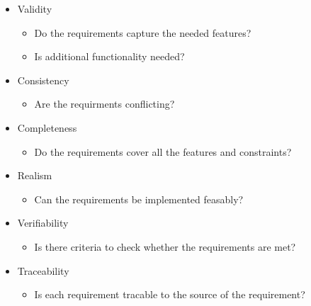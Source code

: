 \documentclass[
../../Software_Engineering_Summary.tex,
]
{subfiles}
\begin{document}
\begin{greenbox}
    \begin{itemize}
        \item Validity
        \begin{itemize}
            \item Do the requirements capture the needed features?
            \item Is additional functionality needed?
        \end{itemize}
        \item Consistency
        \begin{itemize}
            \item Are the requirments conflicting?
        \end{itemize}
        \item Completeness
        \begin{itemize}
            \item Do the requirements cover all the features and constraints?
        \end{itemize}
        \item Realism
        \begin{itemize}
            \item Can the requirements be implemented feasably?
        \end{itemize}
        \item Verifiability
        \begin{itemize}
            \item Is there criteria to check whether the requirements are met?
        \end{itemize}
        \item Traceability
        \begin{itemize}
            \item Is each requirement tracable to the source of the requirement?
        \end{itemize}
    \end{itemize}
\end{greenbox}
\end{document}
